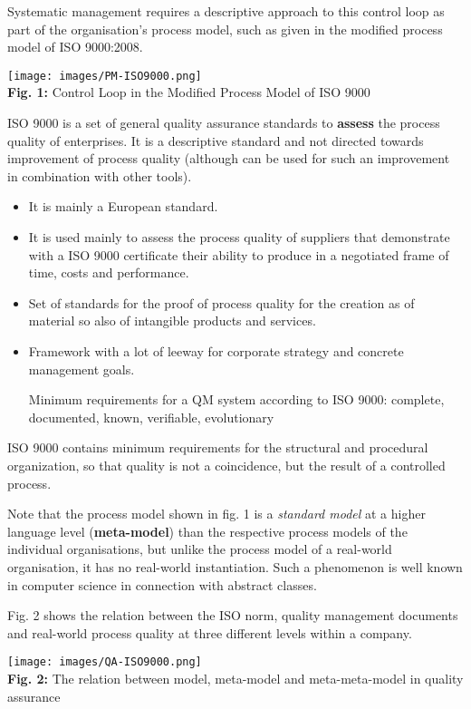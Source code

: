 \documentclass[11pt,a4paper]{article}
\begin{document}
Systematic management requires a descriptive approach to this control loop as
part of the organisation's process model, such as given in the modified
process model of ISO 9000:2008.
\begin{center}
  \texttt{[image: images/PM-ISO9000.png]}\\ \textbf{Fig. 1:}
  Control Loop in the Modified Process Model of ISO 9000
\end{center}
ISO 9000 is a set of general quality assurance standards to \textbf{assess}
the process quality of enterprises. It is a descriptive standard and not
directed towards improvement of process quality (although can be used for such
an improvement in combination with other tools).
\begin {itemize} 
\item It is mainly a European standard.
\item It is used mainly to assess the process quality of suppliers that
  demonstrate with a ISO 9000 certificate their ability to produce in a
  negotiated frame of time, costs and performance. 
\item Set of standards for the proof of process quality for the creation as of
  material so also of intangible products and services.
\item Framework with a lot of leeway for corporate strategy and concrete
  management goals.

  Minimum requirements for a QM system according to ISO 9000: complete,
  documented, known, verifiable, evolutionary
\end {itemize}
ISO 9000 contains minimum requirements for the structural and procedural
organization, so that quality is not a coincidence, but the result of a
controlled process.

Note that the process model shown in fig. 1 is a \emph{standard model} at a
higher language level (\textbf{meta-model}) than the respective process models
of the individual organisations, but unlike the process model of a real-world
organisation, it has no real-world instantiation. Such a phenomenon is well
known in computer science in connection with abstract classes.

Fig. 2 shows the relation between the ISO norm, quality management documents
and real-world process quality at three different levels within a company.  

\begin{center}
  \texttt{[image: images/QA-ISO9000.png]}\\ \textbf{Fig. 2:}
  The relation between model, meta-model and meta-meta-model in quality
  assurance
\end{center}
\end{document}
